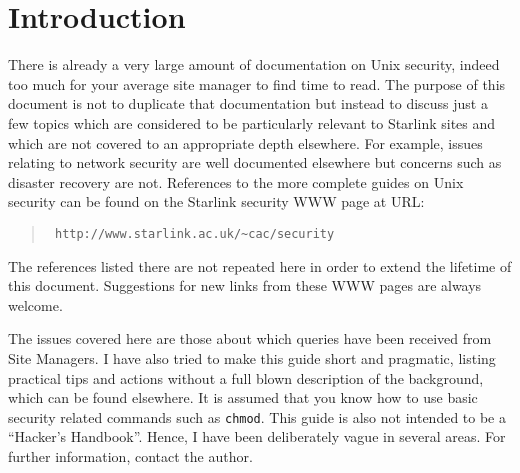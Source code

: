 \documentclass[11pt]{article}
\newcommand{\stardocinitials}  {SSN}
\newcommand{\stardocnumber}    {37.1}
\newcommand{\stardocname}{\stardocinitials /\stardocnumber}
\newcommand{\htmladdnormallink}[2]{#1}
\newenvironment{latexonly}{}{}
\newcommand{\xlabel}[1]{}
\renewcommand{\thepage}{\roman{page}}
\begin{document}
\begin{latexonly}
   \setlength{\parskip}{0mm}
   \tableofcontents
   \setlength{\parskip}{\medskipamount}
   \markright{\stardocname}
\end{latexonly}
\newpage
\renewcommand{\thepage}{\arabic{page}}

\section{\label{introduction}\xlabel{introduction}Introduction}

There is already a very large amount of documentation on Unix security,
indeed too much for your average site manager to find time to read. The
purpose of this document is not to duplicate that documentation but
instead to discuss just a few topics which are considered to be
particularly relevant to Starlink sites and which are not covered to an
appropriate depth elsewhere. For example, issues relating to network
security are well documented elsewhere but concerns such as disaster
recovery are not. References to the more complete guides on Unix
security can be found on the Starlink security WWW page at URL:

\begin{quote}{\tt
\htmladdnormallink{http://www.starlink.ac.uk/\~{}cac/security}
{http://www.starlink.ac.uk/\~{}cac/security}}
\end{quote}

The references listed there are not repeated here in order to extend the
lifetime of this document. Suggestions for new links from these WWW pages
are always welcome.

The issues covered here are those about which queries have been
received from Site Managers. I have also tried to make this guide short
and pragmatic, listing practical tips and actions without a full blown
description of the background, which can be found elsewhere. It is
assumed that you know how to use basic security related commands such
as {\tt chmod}. This guide is also not intended to be a ``Hacker's
Handbook''. Hence, I have been deliberately vague in several
areas. For further information, contact the author.
\end{document}
